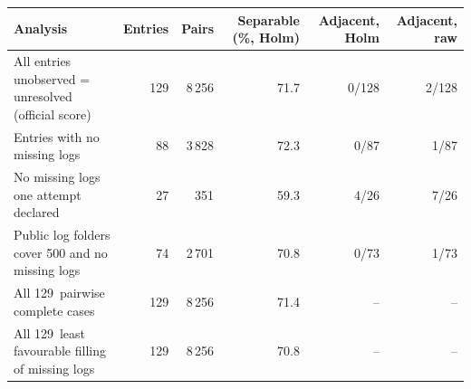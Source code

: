 \begin{tabular}{p{5.6cm}rrrrr}
\toprule
Analysis & Entries & Pairs & Separable (\%, Holm) & Adjacent, Holm & Adjacent, raw \\
\midrule
All entries\, unobserved = unresolved (official score) & 129 & 8\,256 & 71.7 & 0/128 & 2/128 \\
Entries with no missing logs & 88 & 3\,828 & 72.3 & 0/87 & 1/87 \\
No missing logs\, one attempt declared & 27 & 351 & 59.3 & 4/26 & 7/26 \\
Public log folders cover 500 and no missing logs & 74 & 2\,701 & 70.8 & 0/73 & 1/73 \\
All 129\, pairwise complete cases & 129 & 8\,256 & 71.4 & -- & -- \\
All 129\, least favourable filling of missing logs & 129 & 8\,256 & 70.8 & -- & -- \\
\bottomrule
\end{tabular}
